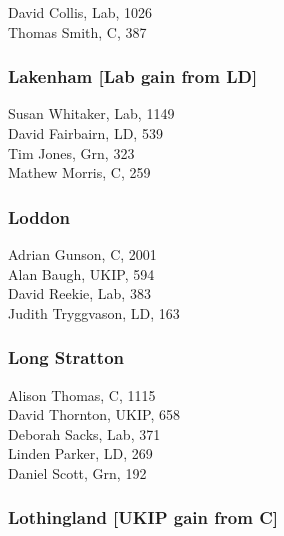 \documentclass[a4paper,openany,10pt]{book}
\begin{document}


David Collis, Lab, 1026\\
Thomas Smith, C, 387\\


\subsubsection*{Lakenham \hspace*{\fill}\nolinebreak[1]%
\enspace\hspace*{\fill}
[Lab gain from LD]}



Susan Whitaker, Lab, 1149\\
David Fairbairn, LD, 539\\
Tim Jones, Grn, 323\\
Mathew Morris, C, 259\\


\subsubsection*{Loddon}



Adrian Gunson, C, 2001\\
Alan Baugh, UKIP, 594\\
David Reekie, Lab, 383\\
Judith Tryggvason, LD, 163\\


\subsubsection*{Long Stratton}



Alison Thomas, C, 1115\\
David Thornton, UKIP, 658\\
Deborah Sacks, Lab, 371\\
Linden Parker, LD, 269\\
Daniel Scott, Grn, 192\\


\subsubsection*{Lothingland \hspace*{\fill}\nolinebreak[1]%
\enspace\hspace*{\fill}
[UKIP gain from C]}
\end{document}
